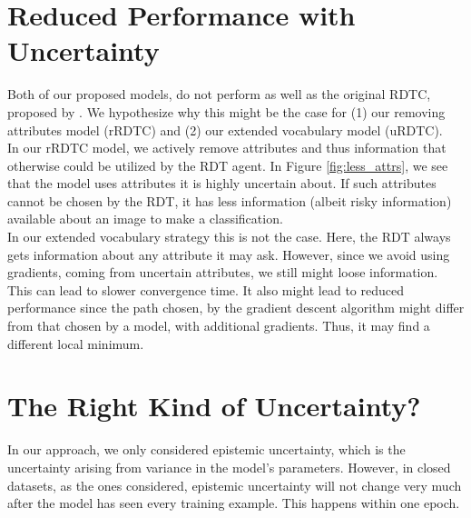 \documentclass[a4paper,cleardoubleempty,BCOR1cm, 11pt]{report}
\begin{document}
\section{Reduced Performance with Uncertainty}
Both of our proposed models, do not perform as well as the original RDTC, proposed by \citet{alaniz2019explainable}. We hypothesize why this might be the case for (1) our removing attributes model (rRDTC) and (2) our extended vocabulary model (uRDTC).\\
In our rRDTC model, we actively remove attributes and thus information that otherwise could be utilized by the RDT agent. In Figure \ref{fig:less_attrs}, we see that the model uses attributes it is highly uncertain about. If such attributes cannot be chosen by the RDT, it has less information (albeit risky information) available about an image to make a classification.\\
In our extended vocabulary strategy this is not the case. Here, the RDT always gets information about any attribute it may ask. However, since we avoid using gradients, coming from uncertain attributes, we still might loose information. This can lead to slower convergence time. It also might lead to reduced performance since the path chosen, by the gradient descent algorithm might differ from that chosen by a model, with additional gradients. Thus, it may find a different local minimum.



\section{The Right Kind of Uncertainty?}
In our approach, we only considered epistemic uncertainty, which is the uncertainty arising from variance in the model's parameters. However, in closed datasets, as the ones considered, epistemic uncertainty will not change very much after the model has seen every training example. This happens within one epoch.
\end{document}
